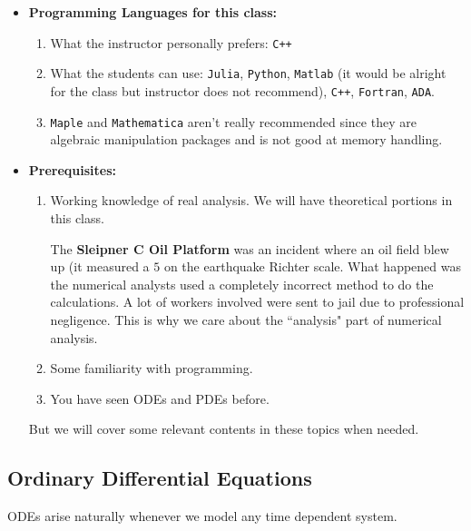 \documentclass{article}
\begin{document}
\begin{itemize}
    \item \textbf{Programming Languages for this class: }
    \begin{enumerate}
        \item What the instructor personally prefers: \texttt{C++}
        \item What the students can use: \texttt{Julia}, \texttt{Python}, \texttt{Matlab} (it would be alright for the class but instructor does not recommend), \texttt{C++}, \texttt{Fortran}, \texttt{ADA}.
        \item \texttt{Maple} and \texttt{Mathematica} aren't really recommended since they are algebraic manipulation packages and is not good at memory handling.
    \end{enumerate}

    \item \textbf{Prerequisites: } 
    \begin{enumerate}
        \item Working knowledge of real analysis. We will have theoretical portions in this class.
     \begin{remark}
        The \textbf{Sleipner C Oil Platform} was an incident where an oil field blew up (it measured a $5$ on the earthquake Richter scale. What happened was the numerical analysts used a completely incorrect method to do the calculations. A lot of workers involved were sent to jail due to professional negligence. This is why we care about the ``analysis" part of numerical analysis.
    \end{remark}
        \item Some familiarity with programming.
        \item You have seen ODEs and PDEs before.
    \end{enumerate}
    But we will cover some relevant contents in these topics when needed.
\end{itemize}


\subsection{Ordinary Differential Equations}

ODEs arise naturally whenever we model any time dependent system.
\end{document}
